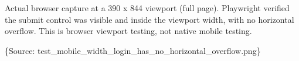 \documentclass[
  11pt,
]{article}
\begin{document}
Actual browser capture at a 390 x 844 viewport (full page). Playwright
verified the submit control was visible and inside the viewport width,
with no horizontal overflow. This is browser viewport testing, not
native mobile testing.

\{\small Source:
test\_mobile\_width\_login\_has\_no\_horizontal\_overflow.png\}
\end{document}

